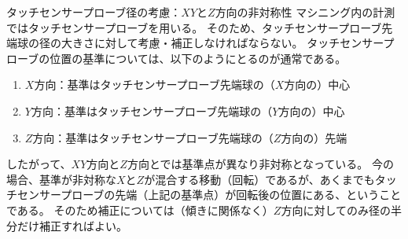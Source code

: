 \begin{Column}{タッチセンサープローブ径の考慮：$XY$と$Z$方向の非対称性}
マシニング内の計測ではタッチセンサープローブを用いる。
そのため、タッチセンサープローブ先端球の径の大きさに対して考慮・補正しなければならない。
タッチセンサープローブの位置の基準については、以下のようにとるのが通常である。
\begin{enumerate}
\item $X$方向：基準はタッチセンサープローブ先端球の（$X$方向の）中心
\item $Y$方向：基準はタッチセンサープローブ先端球の（$Y$方向の）中心
\item $Z$方向：基準はタッチセンサープローブ先端球の（$Z$方向の）先端
\end{enumerate}
したがって、$XY$方向と$Z$方向とでは基準点が異なり非対称となっている。
今の場合、基準が非対称な$X$と$Z$が混合する移動（回転）であるが、あくまでもタッチセンサープローブの先端（上記の基準点）が回転後の位置にある、ということである。
そのため補正については（傾きに関係なく）$Z$方向に対してのみ径の半分だけ補正すればよい。
\end{Column}


